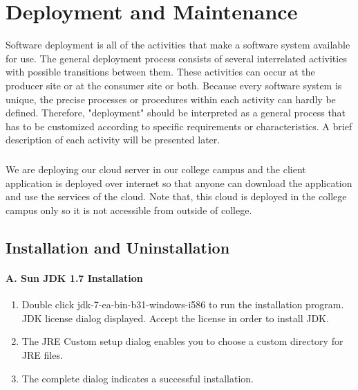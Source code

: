 \chapter{ Deployment and Maintenance}
Software deployment is all of the activities that make a software system available for use. The general deployment process consists of several interrelated activities with possible transitions between them. These activities can occur at the producer site or at the consumer site or both. Because every software system is unique, the precise processes or procedures within each activity can hardly be defined. Therefore, "deployment" should be interpreted as a general process that has to be customized according to specific requirements or characteristics. A brief description of each activity will be presented later.
\paragraph{}
We are deploying our cloud server in our college campus and the client application is deployed over  internet so that anyone can download the application and use the services of the cloud. Note that, this cloud is deployed in the college campus only so it is not accessible from outside of college.
\paragraph{}
\section{Installation and Uninstallation}
\subsubsection{A. Sun JDK 1.7 Installation}
\begin{enumerate}
\item Double click jdk-7-ea-bin-b31-windows-i586 to run the installation program. JDK license dialog displayed. Accept the license in order to install JDK.
\item The JRE Custom setup dialog enables you to choose a custom directory for JRE files.
\item The complete dialog indicates a successful installation.
\end{enumerate}
\paragraph{}
